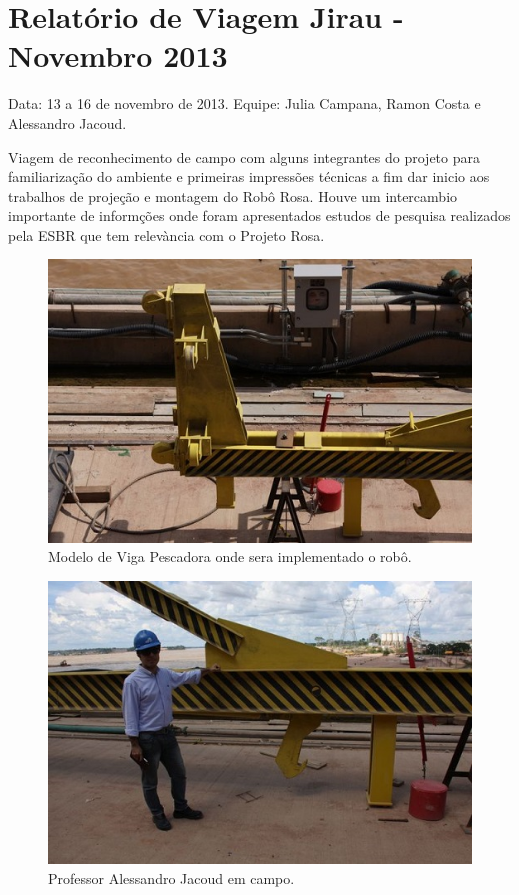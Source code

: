 \section{Relatório de Viagem Jirau - Novembro 2013}
Data: 13 a 16 de novembro de 2013.
Equipe: Julia Campana, Ramon Costa e Alessandro Jacoud.


Viagem de reconhecimento de campo com alguns integrantes do projeto para
familiarização do ambiente e primeiras impressões técnicas a fim dar inicio aos
trabalhos de projeção e montagem do Robô Rosa. Houve um intercambio importante
de informções onde foram apresentados estudos de pesquisa realizados pela ESBR
que tem relevància com o Projeto Rosa.



\begin{figure}[h!]
\centering
  \includegraphics[width=1\linewidth]{Fotos/Novembro2013/1.jpg}
  \caption{Modelo de Viga Pescadora onde sera implementado o robô.}
  \label{nov20131}
\end{figure}

\begin{figure}[h!]
  \centering
  \includegraphics[width=1\linewidth]{Fotos/Novembro2013/2.jpg}
  \caption{Professor Alessandro Jacoud em campo.}
  \label{nov20132}
\end{figure}

